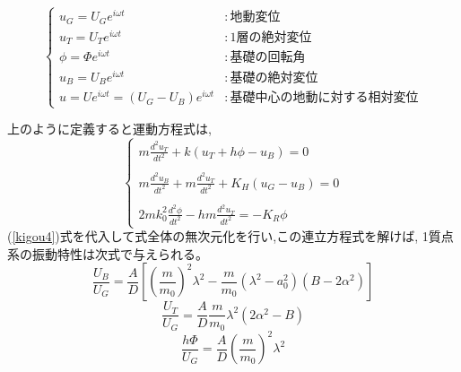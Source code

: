 \documentclass[titlepage]{jsarticle}
\def\dfrac#1#2{{\displaystyle\frac{#1}{#2}}}
\begin{document}
\begin{equation} \left\{ \begin{array}{ll}
u_G = U_G e^{i\omega t} & :地動変位 \\
u_T = U_T e^{i\omega t} & :1層の絶対変位 \\
\phi = \Phi e^{i\omega t} & :基礎の回転角 \\
u_B = U_B e^{i\omega t} & :基礎の絶対変位 \\
u = U e^{i\omega t} = (U_G - U_B) e^{i\omega t} & :基礎中心の地動に対する相対変位
\end{array} \right. \label{kigou4}
\end{equation}

上のように定義すると運動方程式は,
\begin{equation}\left\{\begin{array}{l}
m\dfrac{d^2u_T}{dt^2} + k\left( u_T+h\phi -u_B\right) =0 \\ \\
m\dfrac{d^2u_B}{dt^2} + m\dfrac{d^2u_T}{dt^2} + K_H\left(u_G-u_B\right) =0 \\ \\
2mk_0^2\dfrac{d^2\phi}{dt^2} - hm\dfrac{d^2u_T}{dt^2} = -K_R \phi
\end{array}\right.\label{undou}
\end{equation}
(\ref{kigou4})式を代入して式全体の無次元化を行い,この連立方程式を解けば,
1質点系の振動特性は次式で与えられる。
\begin{equation}
\dfrac{U_B}{U_G} = \dfrac{A}{D} \left[ \left( \dfrac{m}{m_0} \right) ^2 \lambda ^2
	- \dfrac{m}{m_0} \left( \lambda ^2 - a_0^2 \right) \left( B-2\alpha ^2 \right)
	\right] \label{kisoheni}
\end{equation}
%
\begin{equation}
\dfrac{U_T}{U_G} = \dfrac{A}{D} \dfrac{m}{m_0} \lambda ^2 \left( 2\alpha ^2 - B \right)
\label{sitsuheni} \end{equation}
%
\begin{equation}
\dfrac{h\Phi }{U_G} = \dfrac{A}{D} \left( \dfrac{m}{m_0} \right) ^2 \lambda ^2
\label{kaiten} \end{equation}
\end{document}
